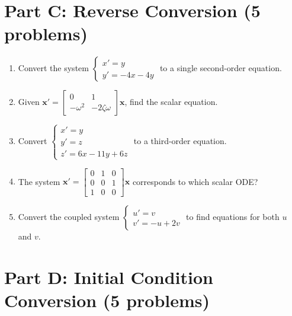 \documentclass[12pt]{article}
\begin{document}
\section*{Part C: Reverse Conversion (5 problems)}

\begin{enumerate}[resume]
\item Convert the system $\begin{cases} x' = y \\ y' = -4x - 4y \end{cases}$ to a single second-order equation.

\item Given $\mathbf{x}' = \begin{bmatrix} 0 & 1 \\ -\omega^{2} & -2\zeta\omega \end{bmatrix}\mathbf{x}$, find the scalar equation.

\item Convert $\begin{cases} x' = y \\ y' = z \\ z' = 6x - 11y + 6z \end{cases}$ to a third-order equation.

\item The system $\mathbf{x}' = \begin{bmatrix} 0 & 1 & 0 \\ 0 & 0 & 1 \\ 1 & 0 & 0 \end{bmatrix}\mathbf{x}$ corresponds to which scalar ODE?

\item Convert the coupled system $\begin{cases} u' = v \\ v' = -u + 2v \end{cases}$ to find equations for both $u$ and $v$.
\end{enumerate}

\section*{Part D: Initial Condition Conversion (5 problems)}

\end{document}

